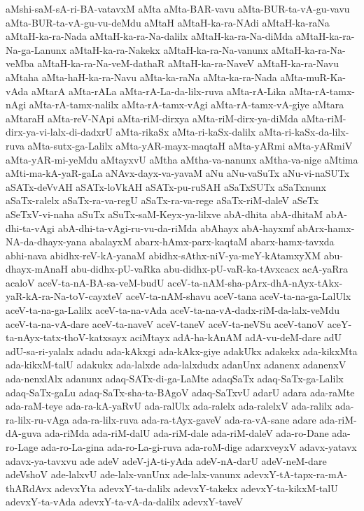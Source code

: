 {aMshi-saM-sA-ri-BA-vatavxM
aMta
aMta-BAR-vavu
aMta-BUR-ta-vA-gu-vavu
aMta-BUR-ta-vA-gu-vu-deMdu
aMtaH
aMtaH-ka-ra-NAdi
aMtaH-ka-raNa
aMtaH-ka-ra-Nada
aMtaH-ka-ra-Na-dalilx
aMtaH-ka-ra-Na-diMda
aMtaH-ka-ra-Na-ga-Lanunx
aMtaH-ka-ra-Nakekx
aMtaH-ka-ra-Na-vanunx
aMtaH-ka-ra-Na-veMba
aMtaH-ka-ra-Na-veM-dathaR
aMtaH-ka-ra-NaveV
aMtaH-ka-ra-Navu
aMtaha
aMta-haH-ka-ra-Navu
aMta-ka-raNa
aMta-ka-ra-Nada
aMta-muR-Ka-vAda
aMtarA
aMta-rALa
aMta-rA-La-da-lilx-ruva
aMta-rA-Lika
aMta-rA-tamx-nAgi
aMta-rA-tamx-nalilx
aMta-rA-tamx-vAgi
aMta-rA-tamx-vA-giye
aMtara
aMtaraH
aMta-reV-NApi
aMta-riM-dirxya
aMta-riM-dirx-ya-diMda
aMta-riM-dirx-ya-vi-lalx-di-dadxrU
aMta-rikaSx
aMta-ri-kaSx-dalilx
aMta-ri-kaSx-da-lilx-ruva
aMta-sutx-ga-Lalilx
aMta-yAR-mayx-maqtaH
aMta-yARmi
aMta-yARmiV
aMta-yAR-mi-yeMdu
aMtayxvU
aMtha
aMtha-va-nanunx
aMtha-va-nige
aMtima
aMti-ma-kA-yaR-gaLa
aNAvx-dayx-va-yavaM
aNu
aNu-vaSuTx
aNu-vi-naSUTx
aSATx-deVvAH
aSATx-loVkAH
aSATx-pu-ruSAH
aSaTxSUTx
aSaTxnunx
aSaTx-ralelx
aSaTx-ra-va-regU
aSaTx-ra-va-rege
aSaTx-riM-daleV
aSeTx
aSeTxV-vi-naha
aSuTx
aSuTx-saM-Keyx-ya-lilxve
abA-dhita
abA-dhitaM
abA-dhi-ta-vAgi
abA-dhi-ta-vAgi-ru-vu-da-riMda
abAhayx
abA-hayxmf
abArx-hamx-NA-da-dhayx-yana
abalayxM
abarx-hAmx-parx-kaqtaM
abarx-hamx-tavxda
abhi-nava
abidhx-reV-kA-yanaM
abidhx-sAthx-niV-ya-meY-kAtamxyXM
abu-dhayx-mAnaH
abu-didhx-pU-vaRka
abu-didhx-pU-vaR-ka-tAvxcacx
acA-yaRra
acaloV
aceV-ta-nA-BA-sa-veM-budU
aceV-ta-nAM-sha-pArx-dhA-nAyx-tAkx-yaR-kA-ra-Na-toV-cayxteV
aceV-ta-nAM-shavu
aceV-tana
aceV-ta-na-ga-LalUlx
aceV-ta-na-ga-Lalilx
aceV-ta-na-vAda
aceV-ta-na-vA-dadx-riM-da-lalx-veMdu
aceV-ta-na-vA-dare
aceV-ta-naveV
aceV-taneV
aceV-ta-neVSu
aceV-tanoV
aceY-ta-nAyx-tatx-thoV-katxsayx
aciMtayx
adA-ha-kAnAM
adA-vu-deM-dare
adU
adU-sa-ri-yalalx
adadu
ada-kAkxgi
ada-kAkx-giye
adakUkx
adakekx
ada-kikxMta
ada-kikxM-talU
adakukx
ada-lalxde
ada-lalxdudx
adanUnx
adanenx
adanenxV
ada-nenxlAlx
adanunx
adaq-SATx-di-ga-LaMte
adaqSaTx
adaq-SaTx-ga-Lalilx
adaq-SaTx-gaLu
adaq-SaTx-sha-ta-BAgoV
adaq-SaTxvU
adarU
adara
ada-raMte
ada-raM-teye
ada-ra-kA-yaRvU
ada-ralUlx
ada-ralelx
ada-ralelxV
ada-ralilx
ada-ra-lilx-ru-vAga
ada-ra-lilx-ruva
ada-ra-tAyx-gaveV
ada-ra-vA-sane
adare
ada-riM-dA-guva
ada-riMda
ada-riM-dalU
ada-riM-dale
ada-riM-daleV
ada-ro-Dane
ada-ro-Lage
ada-ro-La-gina
ada-ro-La-gi-ruva
ada-roM-dige
adarxveyxV
adavx-yatavx
adavx-ya-tavxvu
ade
adeV
adeV-jA-ti-yAda
adeV-nA-darU
adeV-neM-dare
adeVshoV
ade-lalxvU
ade-lalx-vanUnx
ade-lalx-vanunx
adevxY-tA-tapx-ra-mA-thARdAvx
adevxYta
adevxY-ta-dalilx
adevxY-takekx
adevxY-ta-kikxM-talU
adevxY-ta-vAda
adevxY-ta-vA-da-dalilx
adevxY-taveV
}
